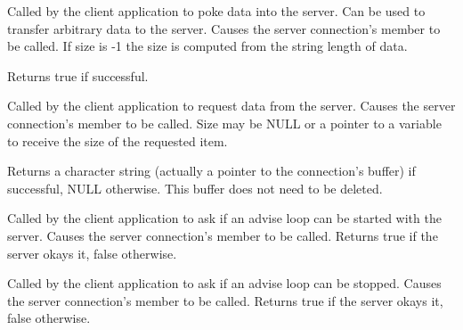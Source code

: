 \label{wxconnectionpoke}





Called by the client application to poke data into the server.
Can be used to transfer arbitrary data to the server. Causes the
server connection's  member to
be called. If size is -1 the size is computed from the string
length of data.

Returns true if successful.

\label{wxconnectionrequest}


Called by the client application to request data from the server.
Causes the server connection's  
member to be called. Size may be NULL or a pointer to a variable
to receive the size of the requested item.

Returns a character string (actually a pointer to the
connection's buffer) if successful, NULL otherwise. This buffer
does not need to be deleted.

\label{wxconnectionstartadvise}


Called by the client application to ask if an advise loop can be
started with the server. Causes the server connection's 
\rtfsp
member to be called. Returns true if the server okays it, false
otherwise.

\label{wxconnectionstopadvise}


Called by the client application to ask if an advise loop can be
stopped. Causes the server connection's  
member to be called. Returns true if the server okays it, false
otherwise.

